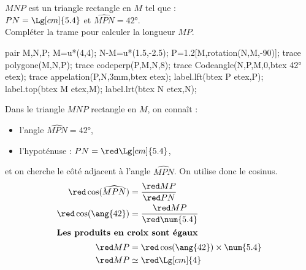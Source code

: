 \begin{corrige}
    $MNP$ est un triangle rectangle en $M$ tel que :\\$PN=\Lg[cm]{5.4}$ et $\widehat{MPN}=\ang{42}$.\\
    Compléter la trame pour calculer la longueur $MP$.
    \begin{center}
        \begin{Geometrie}[CoinHD={(6u,4.5u)}]        
            pair M,N,P;
            M=u*(4,4);
            N-M=u*(1.5,-2.5);
            P=1.2[M,rotation(N,M,-90)];
            trace polygone(M,N,P);            
            trace codeperp(P,M,N,8);
            trace Codeangle(N,P,M,0,btex \ang{42} etex);
            trace appelation(P,N,3mm,btex  etex);
            label.lft(btex P etex,P);
            label.top(btex M etex,M);
            label.lrt(btex N etex,N);
        \end{Geometrie}
    \end{center}
    \Coupe
    Dans le triangle $MNP$ {\red rectangle} en {\red $M$}, on connaît :
    \begin{itemize}        
        \item l'angle {\red $\widehat{MPN}=\ang{42}$},
        \item l'hypoténuse : $PN={\red\Lg[cm]{5.4}}$,
    \end{itemize}
    et on cherche le côté {\red adjacent} à l'angle $\widehat{MPN}$. On utilise donc {\red le cosinus}.
    \begin{align*}
        {\red \cos(\widehat{MPN})}&=\frac{\red MP}{\red PN}\\        
        {\red \cos(\ang{42})}&=\frac{\red MP}{\red \num{5.4}}\\        
        \intertext{\centering\bf Les produits en croix sont égaux}
        {\red MP}&={\red \cos(\ang{42})\times \num{5.4}}\\        
        {\red MP}&\simeq {\red\Lg[cm]{4}}
    \end{align*}
\end{corrige}

